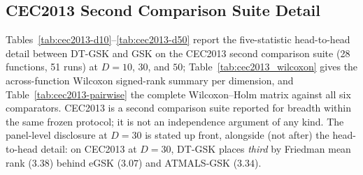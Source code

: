\documentclass[algorithms,article,submit,moreauthors,pdftex]{Definitions/mdpi}
\newcommand{\dtgsk}{DT-GSK}
\newcommand{\atmals}{ATMALS-GSK}
\newcommand{\egsk}{eGSK}
\begin{document}
\subsection{CEC2013 Second Comparison Suite Detail}\label{sec:supp:cec2013}

Tables~\ref{tab:cec2013-d10}--\ref{tab:cec2013-d50} report the
five-statistic head-to-head detail between \dtgsk{} and GSK on the
CEC2013 second comparison suite (28 functions, 51 runs) at $D = 10$,
$30$, and $50$; Table~\ref{tab:cec2013_wilcoxon} gives the
across-function Wilcoxon signed-rank summary per dimension, and
Table~\ref{tab:cec2013-pairwise} the complete Wilcoxon--Holm matrix
against all six comparators.
CEC2013 is a second comparison suite reported for breadth within the
same frozen protocol; it is not an independence argument of any kind.
The panel-level disclosure at $D = 30$ is stated up front, alongside
(not after) the head-to-head detail: on CEC2013 at $D = 30$,
\dtgsk{} places \emph{third} by Friedman mean rank ($3.38$) behind
\egsk{} ($3.07$) and \atmals{} ($3.34$).

\begin{table}[p]
\caption{CEC2013 second comparison suite at $D = 10$ (28 functions,
51 runs): best / median / worst / mean / SD of the final error for GSK
vs.\ \dtgsk{}; best mean per function in bold.  CEC2013 is a second
comparison suite reported for breadth of comparison.  }\label{tab:cec2013-d10}
\centering
\tablesize{\footnotesize}
\resizebox{\textwidth}{!}{}
\end{table}

\begin{table}[p]
\caption{CEC2013 second comparison suite at $D = 30$ (28 functions,
51 runs): best / median / worst / mean / SD of the final error for GSK
vs.\ \dtgsk{}; best mean per function in bold.  Panel-level context at
this dimension: \dtgsk{} places third by Friedman mean rank ($3.38$)
behind \egsk{} ($3.07$) and \atmals{} ($3.34$).  }\label{tab:cec2013-d30}
\centering
\tablesize{\footnotesize}
\resizebox{\textwidth}{!}{}
\end{table}

\begin{table}[p]
\caption{CEC2013 second comparison suite at $D = 50$ (28 functions,
51 runs): best / median / worst / mean / SD of the final error for GSK
vs.\ \dtgsk{}; best mean per function in bold.  }\label{tab:cec2013-d50}
\centering
\tablesize{\footnotesize}
\resizebox{\textwidth}{!}{}
\end{table}
\end{document}
